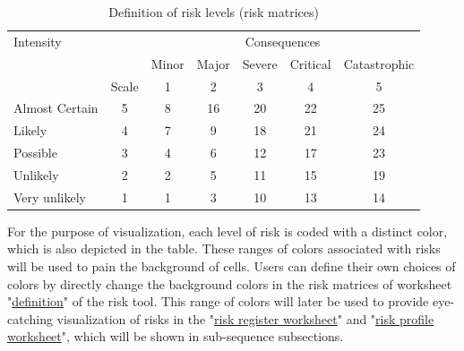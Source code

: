 \documentclass[10pt,halfline,a4paper]{ouparticle}
\begin{document}
\begin{table}
\centering
\caption{Definition of risk levels (risk matrices)}
\begin{tabular}{l|l|l|l|l|l|l}
\hline
Intensity &  & \multicolumn{5}{c}{Consequences} \\ 
\cline{3-7}
 &  & Minor & Major & Severe & Critical & Catastrophic \\ 
\cline{3-7}
 & \multicolumn{1}{c|}{Scale} & \multicolumn{1}{c|}{1} & \multicolumn{1}{c|}{2} & \multicolumn{1}{c|}{3} & \multicolumn{1}{c|}{4} & \multicolumn{1}{c}{5} \\ 
\hline
Almost Certain & \multicolumn{1}{c|}{5} & \multicolumn{1}{c|}{\cellcolor{brown}\color{white}8} & \multicolumn{1}{c|}{\cellcolor{blue}\color{white}16} & \multicolumn{1}{c|}{\cellcolor{violet}\color{white}20} & \multicolumn{1}{c|}{\cellcolor{black}\color{white}22} & \multicolumn{1}{c}{\cellcolor{black}\color{white}25} \\ 
\hline
Likely & \multicolumn{1}{c|}{4} & \multicolumn{1}{c|}{\cellcolor{brown}\color{white}7} & \multicolumn{1}{c|}{\cellcolor{brown}\color{white}9} & \multicolumn{1}{c|}{\cellcolor{violet}\color{white}18} & \multicolumn{1}{c|}{\cellcolor{violet}\color{white}21} & \multicolumn{1}{c}{\cellcolor{black}\color{white}24} \\ 
\hline
Possible & \multicolumn{1}{c|}{3} & \multicolumn{1}{c|}{\cellcolor{green}\color{black}4} & \multicolumn{1}{c|}{\cellcolor{brown}\color{white}6} & \multicolumn{1}{c|}{\cellcolor{blue}\color{white}12} & \multicolumn{1}{c|}{\cellcolor{violet}\color{white}17} & \multicolumn{1}{c}{\cellcolor{black}\color{white}23} \\ 
\hline
Unlikely & \multicolumn{1}{c|}{2} & \multicolumn{1}{c|}{\cellcolor{green}\color{black}2} & \multicolumn{1}{c|}{\cellcolor{green}\color{black}5} & \multicolumn{1}{c|}{\cellcolor{brown}\color{white}11} & \multicolumn{1}{c|}{\cellcolor{blue}\color{white}15} & \multicolumn{1}{c}{\cellcolor{violet}\color{white}19} \\ 
\hline
Very unlikely & \multicolumn{1}{c|}{1} & \multicolumn{1}{c|}{\cellcolor{green}\color{black}1} & \multicolumn{1}{c|}{\cellcolor{green}\color{black}3} & \multicolumn{1}{c|}{\cellcolor{brown}\color{white}10} & \multicolumn{1}{c|}{\cellcolor{blue}\color{white}13} & \multicolumn{1}{c}{\cellcolor{blue}\color{white}14} \\ 
\hline
\end{tabular}
\label{tbl_risks}
\end{table}
For the purpose of visualization, each level of risk is coded with a distinct color, which is also depicted in the table. These ranges of colors associated with risks will be used to pain the background of cells. Users can define their own choices of colors by directly change the background colors in the risk matrices of worksheet "\underline{definition}" of the risk tool. This range of colors will later be used to provide eye-catching visualization of risks in the "\underline{risk register worksheet}" and "\underline{risk profile worksheet}", which will be shown in sub-sequence subsections.
\end{document}
